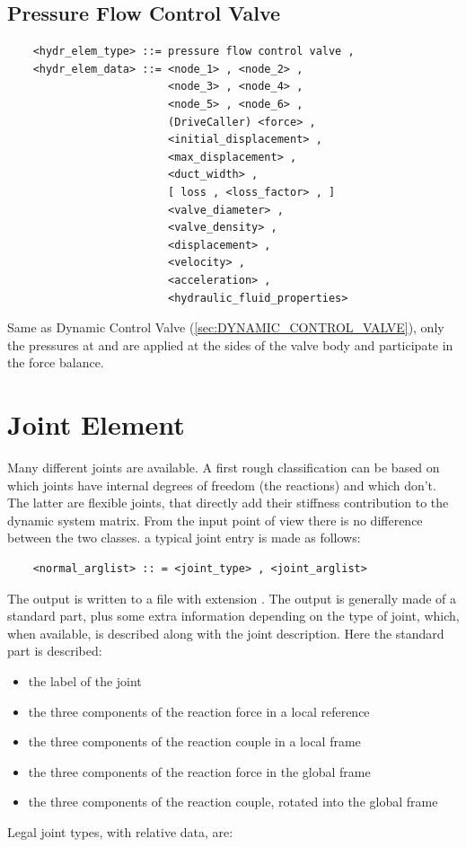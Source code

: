 \subsection{Pressure Flow Control Valve}
\begin{verbatim}
    <hydr_elem_type> ::= pressure flow control valve ,
    <hydr_elem_data> ::= <node_1> , <node_2> ,
                         <node_3> , <node_4> ,
                         <node_5> , <node_6> ,
                         (DriveCaller) <force> ,
                         <initial_displacement> ,
                         <max_displacement> ,
                         <duct_width> ,
                         [ loss , <loss_factor> , ]
                         <valve_diameter> ,
                         <valve_density> ,
                         <displacement> ,
                         <velocity> ,
                         <acceleration> ,
                         <hydraulic_fluid_properties>
\end{verbatim}
Same as Dynamic Control Valve (\ref{sec:DYNAMIC_CONTROL_VALVE}),
only the pressures at  and  are applied
at the sides of the valve body and participate in the force balance.



\section{Joint Element}
Many different joints are available. A first rough classification can be
based on which joints have internal degrees of freedom (the reactions) and
which don't. The latter are flexible joints, that directly add their
stiffness contribution to the dynamic system matrix. From the input point
of view there is no difference between the two classes.
a typical joint entry is made as follows:
\begin{verbatim}
    <normal_arglist> :: = <joint_type> , <joint_arglist>
\end{verbatim}
The output is written to a file with extension .
The output is generally made of a standard part, plus some extra information
depending on the type of joint, which, when available, is described along
with the joint description.
Here the standard part is described:
\begin{itemize}
    \item the label of the joint
    \item the three components of the reaction force in a local reference
    \item the three components of the reaction couple in a local frame
    \item the three components of the reaction force in the global frame
    \item the three components of the reaction couple, rotated into the
          global frame
\end{itemize}
Legal joint types, with relative data, are:


